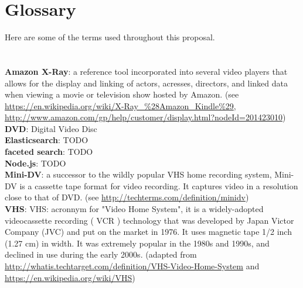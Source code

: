 %
\pagestyle{empty}
\hfill
{}
\section*{Glossary}

Here are some of the terms used throughout this proposal. \\
\\
\\
\textbf{Amazon X-Ray}: a reference tool incorporated into several video players that allows for the display and linking of actors, acresses, directors, and linked data when viewing a movie or television show hosted by Amazon. (see \url{https://en.wikipedia.org/wiki/X-Ray_%28Amazon_Kindle%29}, \url{http://www.amazon.com/gp/help/customer/display.html?nodeId=201423010})\\

\textbf{DVD}: Digital Video Disc \\

\textbf{Elasticsearch}: TODO \\

\textbf{faceted search}: TODO \\

\textbf{Node.js}: TODO \\

\textbf{Mini-DV}: a successor to the wildly popular VHS home recording system, Mini-DV is a cassette tape format for video recording. It captures video in a resolution close to that of DVD. (see \url{http://techterms.com/definition/minidv}) \\

\textbf{VHS}: VHS: acronnym for "Video Home System", it is a widely-adopted videocassette recording ( VCR ) technology that was developed by Japan Victor Company (JVC) and put on the market in 1976. It uses magnetic tape 1/2 inch (1.27 cm) in width.  It was extremely popular in the 1980s and 1990s, and declined in use during the early 2000s. (adapted from \url{http://whatis.techtarget.com/definition/VHS-Video-Home-System} and \url{https://en.wikipedia.org/wiki/VHS}) \\

%
